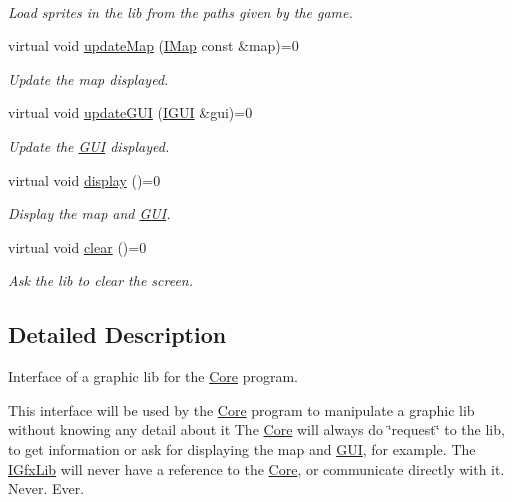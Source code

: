 \begin{DoxyCompactItemize}
$$\begin{DoxyCompactList}\small\item\em Load sprites in the lib from the paths given by the game. \end{DoxyCompactList}\item 
virtual void \hyperlink{classarcade_1_1_i_gfx_lib_addc883f69b75e6ec4927027aad94f5b5}{update\+Map} (\hyperlink{classarcade_1_1_i_map}{I\+Map} const \&map)=0
\begin{DoxyCompactList}\small\item\em Update the map displayed. \end{DoxyCompactList}\item 
virtual void \hyperlink{classarcade_1_1_i_gfx_lib_ae3f443cc341512433815e8bf2dee3e0d}{update\+G\+UI} (\hyperlink{classarcade_1_1_i_g_u_i}{I\+G\+UI} \&gui)=0
\begin{DoxyCompactList}\small\item\em Update the \hyperlink{classarcade_1_1_g_u_i}{G\+UI} displayed. \end{DoxyCompactList}\item 
virtual void \hyperlink{classarcade_1_1_i_gfx_lib_a7f280525c718a44c1e05cfe0ba5304c3}{display} ()=0
\begin{DoxyCompactList}\small\item\em Display the map and \hyperlink{classarcade_1_1_g_u_i}{G\+UI}. \end{DoxyCompactList}\item 
virtual void \hyperlink{classarcade_1_1_i_gfx_lib_a4116b3d4f503c4a795539b584f77a73d}{clear} ()=0
\begin{DoxyCompactList}\small\item\em Ask the lib to clear the screen. \end{DoxyCompactList}\end{DoxyCompactItemize}


\subsection{Detailed Description}
Interface of a graphic lib for the \hyperlink{classarcade_1_1_core}{Core} program. 

This interface will be used by the \hyperlink{classarcade_1_1_core}{Core} program to manipulate a graphic lib without knowing any detail about it The \hyperlink{classarcade_1_1_core}{Core} will always do \char`\"{}request\char`\"{} to the lib, to get information or ask for displaying the map and \hyperlink{classarcade_1_1_g_u_i}{G\+UI}, for example. The \hyperlink{classarcade_1_1_i_gfx_lib}{I\+Gfx\+Lib} will never have a reference to the \hyperlink{classarcade_1_1_core}{Core}, or communicate directly with it. Never. Ever. 

